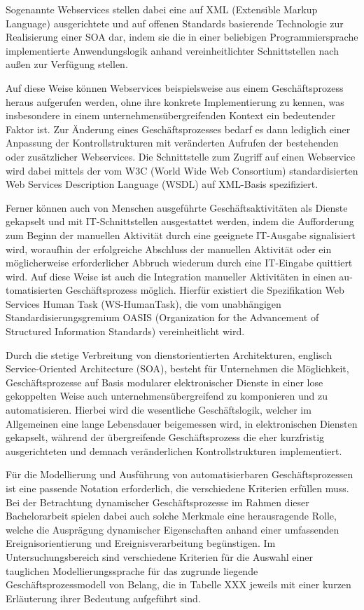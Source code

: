 Sogenannte Webservices stellen dabei eine auf XML (Extensible Markup Language) ausgerichtete und auf offenen Standards basierende Technologie zur Realisierung einer SOA dar, indem sie die in einer beliebigen Programmiersprache implementierte Anwendungslogik anhand vereinheitlichter Schnittstellen nach außen zur Verfügung stellen. 

Auf diese Weise können Webservices beispielsweise aus einem Geschäftsprozess heraus aufgerufen werden, ohne ihre konkrete Implementierung zu kennen, was insbesondere in einem unternehmensübergreifenden Kontext ein bedeutender Faktor ist. 
Zur Änderung eines Geschäftsprozesses bedarf es dann lediglich einer Anpassung der Kontrollstrukturen mit veränderten Aufrufen der bestehenden oder zusätzlicher Webservices. 
Die Schnittstelle zum Zugriff auf einen Webservice wird dabei mittels der vom W3C (World Wide Web Consortium) standardisierten Web Services Description Language (WSDL) auf XML-Basis spezifiziert.

Ferner können auch von Menschen ausgeführte Geschäftsaktivitäten als Dienste gekapselt und mit \ac{IT}-Schnittstellen ausgestattet werden, indem die Aufforderung zum Beginn der manuellen Aktivität durch eine geeignete \ac{IT}-Ausgabe signalisiert wird, woraufhin der erfolgreiche Abschluss der manuellen Aktivität oder ein möglicherweise erforderlicher Abbruch wiederum durch eine \ac{IT}-Eingabe quittiert wird. 
Auf diese Weise ist auch die Integration manueller Aktivitäten in einen au- tomatisierten Geschäftsprozess möglich. 
Hierfür existiert die Spezifikation Web Services Human Task (WS-HumanTask), die vom unabhängigen Standardisierungsgremium OASIS (Organization for the Advancement of Structured Information Standards) vereinheitlicht wird.

Durch die stetige Verbreitung von dienstorientierten Architekturen, englisch Service-Oriented Architecture (SOA), besteht für Unternehmen die Möglichkeit, Geschäftsprozesse auf Basis modularer elektronischer Dienste in einer lose gekoppelten Weise auch unternehmensübergreifend zu komponieren und zu automatisieren. 
Hierbei wird die wesentliche Geschäftslogik, welcher im Allgemeinen eine lange Lebensdauer beigemessen wird, in elektronischen Diensten gekapselt, während der übergreifende Geschäftsprozess die eher kurzfristig ausgerichteten und demnach veränderlichen Kontrollstrukturen implementiert.

Für die Modellierung und Ausführung von automatisierbaren Geschäftsprozessen ist eine passende Notation erforderlich, die verschiedene Kriterien erfüllen muss.
Bei der Betrachtung dynamischer Geschäftsprozesse im Rahmen dieser Bachelorarbeit spielen dabei auch solche Merkmale eine herausragende Rolle, welche die Ausprägung dynamischer Eigenschaften anhand einer umfassenden Ereignisorientierung und Ereignisverarbeitung begünstigen.
Im Untersuchungsbereich sind verschiedene Kriterien für die Auswahl einer tauglichen Modellierungssprache für das zugrunde liegende Geschäftsprozessmodell von Belang, die in Tabelle XXX jeweils mit einer kurzen Erläuterung ihrer Bedeutung aufgeführt sind.

